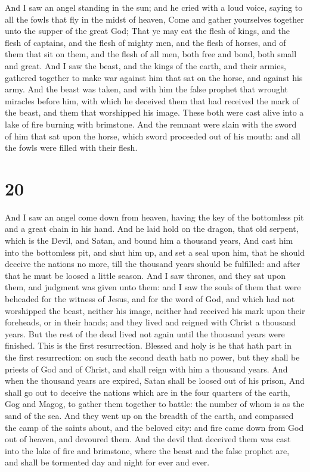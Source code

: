  And I saw an angel standing in the sun; and he cried
with a loud voice, saying to all the fowls that fly in the midst of
heaven, Come and gather yourselves together unto the supper of the great
God;  That ye may eat the flesh of kings, and the flesh
of captains, and the flesh of mighty men, and the flesh of horses, and
of them that sit on them, and the flesh of all men, both free and bond,
both small and great.  And I saw the beast, and the kings
of the earth, and their armies, gathered together to make war against
him that sat on the horse, and against his army.  And the
beast was taken, and with him the false prophet that wrought miracles
before him, with which he deceived them that had received the mark of
the beast, and them that worshipped his image. These both were cast
alive into a lake of fire burning with brimstone.  And
the remnant were slain with the sword of him that sat upon the horse,
which sword proceeded out of his mouth: and all the fowls were filled
with their flesh.

\hypertarget{section-19}{%
\section{20}\label{section-19}}

 And I saw an angel come down from heaven, having the key
of the bottomless pit and a great chain in his hand.  And
he laid hold on the dragon, that old serpent, which is the Devil, and
Satan, and bound him a thousand years,  And cast him into
the bottomless pit, and shut him up, and set a seal upon him, that he
should deceive the nations no more, till the thousand years should be
fulfilled: and after that he must be loosed a little season.
 And I saw thrones, and they sat upon them, and judgment
was given unto them: and I saw the souls of them that were beheaded for
the witness of Jesus, and for the word of God, and which had not
worshipped the beast, neither his image, neither had received his mark
upon their foreheads, or in their hands; and they lived and reigned with
Christ a thousand years.  But the rest of the dead lived
not again until the thousand years were finished. This is the first
resurrection.  Blessed and holy is he that hath part in
the first resurrection: on such the second death hath no power, but they
shall be priests of God and of Christ, and shall reign with him a
thousand years.  And when the thousand years are expired,
Satan shall be loosed out of his prison,  And shall go out
to deceive the nations which are in the four quarters of the earth, Gog
and Magog, to gather them together to battle: the number of whom is as
the sand of the sea.  And they went up on the breadth of
the earth, and compassed the camp of the saints about, and the beloved
city: and fire came down from God out of heaven, and devoured them.
 And the devil that deceived them was cast into the lake
of fire and brimstone, where the beast and the false prophet are, and
shall be tormented day and night for ever and ever.

